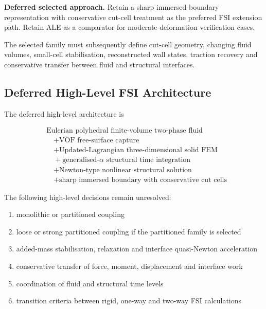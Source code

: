 \textbf{Deferred selected approach.} Retain a sharp immersed-boundary
representation with conservative cut-cell treatment as the preferred
FSI extension path. Retain ALE as a comparator for
moderate-deformation verification cases.

The selected family must subsequently define cut-cell geometry, changing fluid volumes, small-cell stabilisation, reconstructed wall states, traction recovery and conservative transfer between fluid and structural interfaces.

\subsection{Deferred High-Level FSI Architecture}
\label{subsec:res_str_fsi_current_architecture}

The deferred high-level architecture is

\begin{align}
&\text{Eulerian polyhedral finite-volume two-phase fluid}
\nonumber\\
&\quad+
\text{VOF free-surface capture}
\nonumber\\
&\quad+
\text{Updated-Lagrangian three-dimensional solid FEM}
\nonumber\\
&\quad+
\text{generalised-}\alpha\text{ structural time integration}
\nonumber\\
&\quad+
\text{Newton-type nonlinear structural solution}
\nonumber\\
&\quad+
\text{sharp immersed boundary with conservative cut cells}
\label{eq:res_str_fsi_current_architecture}
\end{align}

The following high-level decisions remain unresolved:

\begin{enumerate}
    \item monolithic or partitioned coupling
    \item loose or strong partitioned coupling if the partitioned family is selected
    \item added-mass stabilisation, relaxation and interface quasi-Newton acceleration
    \item conservative transfer of force, moment, displacement and interface work
    \item coordination of fluid and structural time levels
    \item transition criteria between rigid, one-way and two-way FSI calculations
\end{enumerate}

